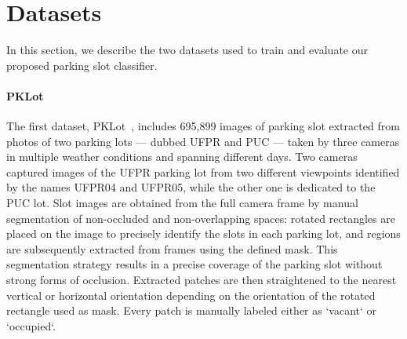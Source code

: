\section{Datasets}
\label{sec:mini:datasets}

In this section, we describe the two datasets used to train and evaluate our proposed parking slot classifier.

\paragraph{PKLot}
The first dataset, PKLot~\cite{de2015pklot}, includes 695,899 images of parking slot extracted from photos of two parking lots --- dubbed UFPR and PUC --- taken by three cameras in multiple weather conditions and spanning different days.
Two cameras captured images of the UFPR parking lot from two different viewpoints identified by the names UFPR04 and UFPR05, while the other one is dedicated to the PUC lot.
Slot images are obtained from the full camera frame by manual segmentation of non-occluded and non-overlapping spaces: rotated rectangles are placed on the image to precisely identify the slots in each parking lot, and regions are subsequently extracted from frames using the defined mask.
This segmentation strategy results in a precise coverage of the parking slot without strong forms of occlusion.
Extracted patches are then straightened to the nearest vertical or horizontal orientation depending on the orientation of the rotated rectangle used as mask.
Every patch is manually labeled either as `vacant` or `occupied`.

